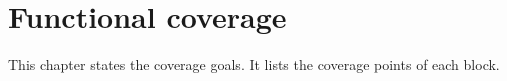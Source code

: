 \chapter{Functional coverage}\label{ds:ch:functional-coverage}

This chapter states the coverage goals. It lists the coverage points of each block.
